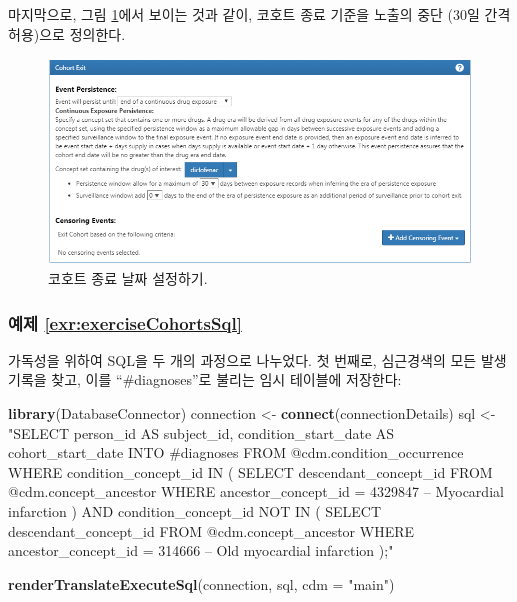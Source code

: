 \documentclass[10.5pt]{book}
\newenvironment{Shaded}{\begin{snugshade}}{\end{snugshade}}
\newcommand{\KeywordTok}[1]{\textcolor[rgb]{0.13,0.29,0.53}{\textbf{#1}}}
\newcommand{\DataTypeTok}[1]{\textcolor[rgb]{0.13,0.29,0.53}{#1}}
\newcommand{\StringTok}[1]{\textcolor[rgb]{0.31,0.60,0.02}{#1}}
\newcommand{\NormalTok}[1]{#1}
\theoremstyle{definition}
\theoremstyle{definition}
\theoremstyle{definition}
\theoremstyle{remark}
\begin{document}
마지막으로, 그림 \ref{fig:cohortsAtlasExit}에서 보이는 것과 같이, 코호트
종료 기준을 노출의 중단 (30일 간격 허용)으로 정의한다.

\begin{figure}

{\centering \includegraphics[width=1\linewidth]{images/SuggestedAnswers/cohortsAtlasExit} 

}

\caption{코호트 종료 날짜 설정하기.}\label{fig:cohortsAtlasExit}
\end{figure}

\subsubsection*{예제
\ref{exr:exerciseCohortsSql}}\label{-refexrexercisecohortssql}

가독성을 위하여 SQL을 두 개의 과정으로 나누었다. 첫 번째로, 심근경색의
모든 발생 기록을 찾고, 이를 ``\#diagnoses''로 불리는 임시 테이블에
저장한다:

\begin{Shaded}
\begin{Highlighting}[]
\KeywordTok{library}\NormalTok{(DatabaseConnector)}
\NormalTok{connection <-}\StringTok{ }\KeywordTok{connect}\NormalTok{(connectionDetails)}
\NormalTok{sql <-}\StringTok{ "SELECT person_id AS subject_id,}
\StringTok{  condition_start_date AS cohort_start_date}
\StringTok{INTO #diagnoses}
\StringTok{FROM @cdm.condition_occurrence}
\StringTok{WHERE condition_concept_id IN (}
\StringTok{    SELECT descendant_concept_id}
\StringTok{    FROM @cdm.concept_ancestor}
\StringTok{    WHERE ancestor_concept_id = 4329847 -- Myocardial infarction}
\StringTok{)}
\StringTok{  AND condition_concept_id NOT IN (}
\StringTok{    SELECT descendant_concept_id}
\StringTok{    FROM @cdm.concept_ancestor}
\StringTok{    WHERE ancestor_concept_id = 314666 -- Old myocardial infarction}
\StringTok{);"}

\KeywordTok{renderTranslateExecuteSql}\NormalTok{(connection, sql, }\DataTypeTok{cdm =} \StringTok{"main"}\NormalTok{)}
\end{Highlighting}
\end{Shaded}
\end{document}
